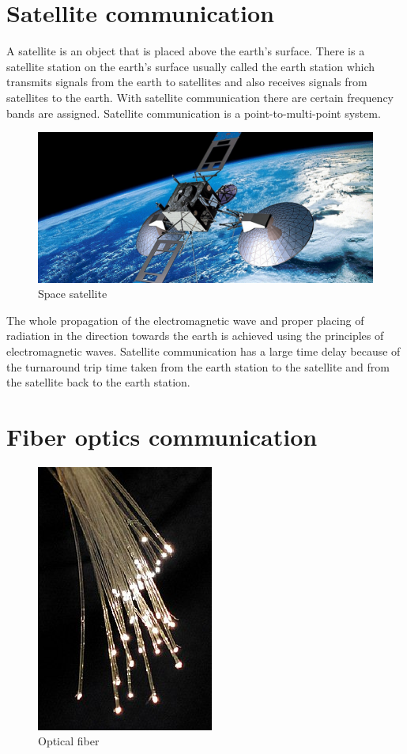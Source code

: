 \section{Satellite communication}
A satellite is an object that is placed above the earth's surface. There is a satellite station on the earth's surface usually called the earth station which transmits signals from the earth to satellites and also receives signals from satellites to the earth. With satellite communication there are certain frequency bands are assigned. Satellite communication is a point-to-multi-point system.

\begin{figure}[h]
\centering
\includegraphics[scale=0.2]{./graphics/satellite}
\caption{Space satellite}
\end{figure}

The whole propagation of the electromagnetic wave and proper placing of radiation in the direction towards the earth is achieved using the principles of electromagnetic waves. Satellite communication has a large time delay because of the turnaround trip time taken from the earth station to the satellite and from the satellite back to the earth station.

\section{Fiber optics communication}
\begin{figure}[h]
\centering
\includegraphics[scale=0.4]{./graphics/opticalfiber1}
\caption{Optical fiber}
\label{fig:opticalfibre1}
\end{figure}

